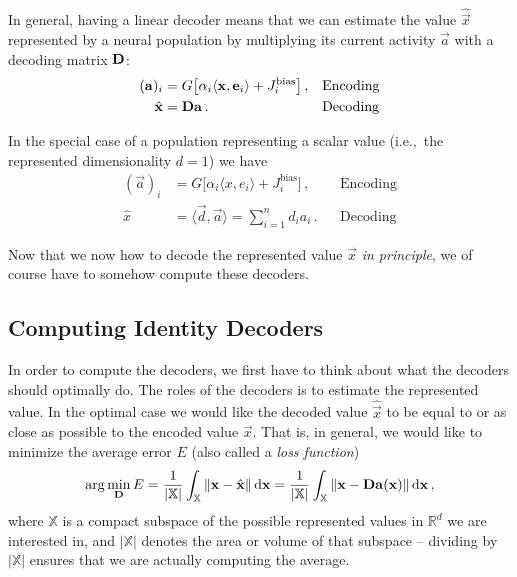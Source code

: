 \documentclass[10pt,letterpaper,oneside]{article}
\begin{document}
In general, having a linear decoder means that we can estimate the value $\hat{\vec x}$ represented by a neural population by multiplying its current activity $\vec a$ with a decoding matrix ${\mathbf{D}}$:
\begin{align*}
	({\mathbf{a}})_i &=
		G\big[\alpha_i \langle {\mathbf{x}}, {\mathbf{e}}_i \rangle + J^\mathrm{bias}_i\big] \,, && \text{Encoding} \\
	\hat{{\mathbf{x}}} &= {\mathbf{D}} {\mathbf{a}} \,. && \text{Decoding}
\end{align*}

In the special case of a population representing a scalar value (i.e.,~the represented dimensionality $d = 1$) we have
\begin{align*}
(\vec a)_i &=
G\big[\alpha_i \langle x, e_i \rangle + J^\mathrm{bias}_i\big] \,, && \text{Encoding} \\
\hat{x} &= \langle \vec d, \vec a \rangle = \sum_{i = 1}^n d_i a_i \,. && \text{Decoding}
\end{align*}

Now that we now how to decode the represented value $\vec x$ \emph{in principle}, we of course have to somehow compute these decoders.


\subsection{Computing Identity Decoders}

In order to compute the decoders, we first have to think about what the decoders should optimally do. The roles of the decoders is to estimate the represented value. In the optimal case we would like the decoded value $\hat{\vec x}$ to be equal to or as close as possible to the encoded value $\vec x$. That is, in general, we would like to minimize the average error $E$ (also called a \emph{loss function})
\begin{align}
	\arg\min_{{\mathbf{D}}} E = \frac{1}{|\mathbb{X}|} \int_{\mathbb{X}} \|{\mathbf{x}} - \hat{{\mathbf{x}}}\| \,\mathrm{d}{\mathbf{x}} = \frac{1}{|\mathbb{X}|} \int_{\mathbb{X}} \|{\mathbf{x}} - {\mathbf{D}} {\mathbf{a}}({\mathbf{x}})\| \,\mathrm{d}{\mathbf{x}} \,,
	\label{eqn:optimisation_problem}
\end{align}
where $\mathbb{X}$ is a compact subspace of the possible represented values in $\mathbb{R}^d$ we are interested in, and $|\mathbb{X}|$ denotes the area or volume of that subspace -- dividing by $|\mathbb{X}|$ ensures that we are actually computing the average.

\end{document}
